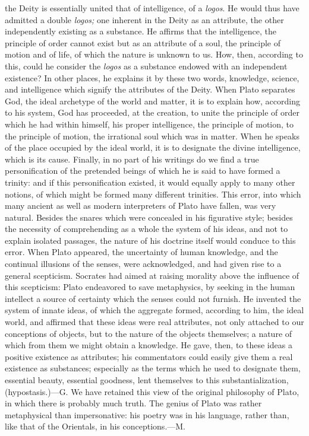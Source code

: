 {the Deity is essentially united that of intelligence, of a
\textit{logos}. He would thus have admitted a double \textit{logos;} one
inherent in the Deity as an attribute, the other
independently existing as a substance. He affirms that the
intelligence, the principle of order cannot exist but as an
attribute of a soul, the principle of motion and of life, of
which the nature is unknown to us. How, then, according to
this, could he consider the \textit{logos} as a substance endowed
with an independent existence? In other places, he explains
it by these two words, knowledge, science, and intelligence
which signify the attributes of the Deity. When Plato
separates God, the ideal archetype of the world and matter,
it is to explain how, according to his system, God has
proceeded, at the creation, to unite the principle of order
which he had within himself, his proper intelligence, the
principle of motion, to the principle of motion, the
irrational soul which was in matter. When he speaks of the
place occupied by the ideal world, it is to designate the
divine intelligence, which is its cause. Finally, in no part
of his writings do we find a true personification of the
pretended beings of which he is said to have formed a
trinity: and if this personification existed, it would
equally apply to many other notions, of which might be formed
many different trinities.
This error, into which many ancient as well as modern
interpreters of Plato have fallen, was very natural. Besides
the snares which were concealed in his figurative style;
besides the necessity of comprehending as a whole the system
of his ideas, and not to explain isolated passages, the
nature of his doctrine itself would conduce to this error.
When Plato appeared, the uncertainty of human knowledge, and
the continual illusions of the senses, were acknowledged, and
had given rise to a general scepticism. Socrates had aimed at
raising morality above the influence of this scepticism:
Plato endeavored to save metaphysics, by seeking in the human
intellect a source of certainty which the senses could not
furnish. He invented the system of innate ideas, of which the
aggregate formed, according to him, the ideal world, and
affirmed that these ideas were real attributes, not only
attached to our conceptions of objects, but to the nature of
the objects themselves; a nature of which from them we might
obtain a knowledge. He gave, then, to these ideas a positive
existence as attributes; his commentators could easily give
them a real existence as substances; especially as the terms
which he used to designate them, essential beauty, essential
goodness, lent themselves to this substantialization,
(hypostasis.)—G.
We have retained this view of the original philosophy of
Plato, in which there is probably much truth. The genius of
Plato was rather metaphysical than impersonative: his poetry
was in his language, rather than, like that of the Orientals,
in his conceptions.—M.}

